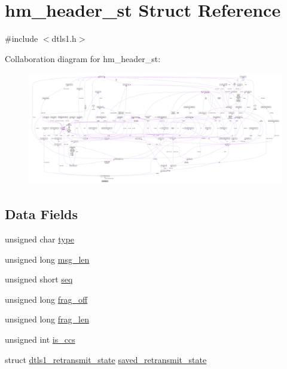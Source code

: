 \hypertarget{structhm__header__st}{}\section{hm\+\_\+header\+\_\+st Struct Reference}
\label{structhm__header__st}


{\ttfamily \#include $<$dtls1.\+h$>$}



Collaboration diagram for hm\+\_\+header\+\_\+st\+:\nopagebreak
\begin{figure}[H]
\begin{center}
\leavevmode
\includegraphics[width=350pt]{structhm__header__st__coll__graph}
\end{center}
\end{figure}
\subsection*{Data Fields}
\begin{DoxyCompactItemize}
\item 
unsigned char \hyperlink{structhm__header__st_aa5044999f3339d2ba3b1bf22fa6cfe95}{type}
\item 
unsigned long \hyperlink{structhm__header__st_abd98ba3fe3e5ad463d3614def95f64c9}{msg\+\_\+len}
\item 
unsigned short \hyperlink{structhm__header__st_ae3912cd83da227c65c49a73665d30e15}{seq}
\item 
unsigned long \hyperlink{structhm__header__st_add4d70beaa661815ac32ade43f854cb8}{frag\+\_\+off}
\item 
unsigned long \hyperlink{structhm__header__st_ad00a64dfd79008ae0f22a6852b51e36c}{frag\+\_\+len}
\item 
unsigned int \hyperlink{structhm__header__st_abc49dd4194c1935979c69d485e00a9b0}{is\+\_\+ccs}
\item 
struct \hyperlink{structdtls1__retransmit__state}{dtls1\+\_\+retransmit\+\_\+state} \hyperlink{structhm__header__st_aec504639074429d1208ba5f0a72904c4}{saved\+\_\+retransmit\+\_\+state}
\end{DoxyCompactItemize}


